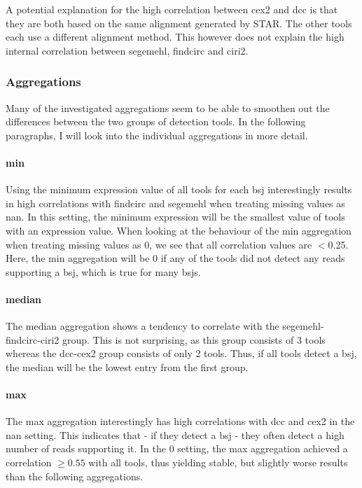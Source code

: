 A potential explanation for the high correlation between \gls{cex2} and
\gls{dcc} is that they are both based on the same alignment generated by
STAR\supercite{dobin_star_2013}.
The other tools each use a different alignment method.
This however does not explain the high internal correlation between
\gls{segemehl}, \gls{findcirc} and \gls{ciri2}.

\subsubsection{Aggregations}
Many of the investigated aggregations seem to be able to smoothen out the
differences between the two groups of detection tools.
In the following paragraphs, I will look into the individual aggregations in
more detail.

\paragraph{min}
Using the minimum expression value of all tools for each \gls{bsj}
interestingly results in high correlations with \gls{findcirc} and
\gls{segemehl} when treating missing values as \gls{nan}.
In this setting, the minimum expression will be the smallest value of tools
with an expression value.
When looking at the behaviour of the min aggregation when treating missing
values as 0, we see that all correlation values are $<$0.25.
Here, the min aggregation will be 0 if any of the tools did not detect any
reads supporting a \gls{bsj}, which is true for many \glspl{bsj}.

\paragraph{median}
The median aggregation shows a tendency to correlate with the
\gls{segemehl}-\gls{findcirc}-\gls{ciri2} group.
This is not surprising, as this group consists of 3 tools whereas the
\gls{dcc}-\gls{cex2} group consists of only 2 tools.
Thus, if all tools detect a \gls{bsj}, the median will be the lowest entry from
the first group.

\paragraph{max}
The max aggregation interestingly has high correlations with \gls{dcc} and \gls{cex2}
in the \gls{nan} setting.
This indicates that - if they detect a \gls{bsj} - they often detect a high
number of reads supporting it.
In the 0 setting, the max aggregation achieved a correlation $\geq 0.55$ with
all tools, thus yielding stable, but slightly worse results than the following
aggregations.

